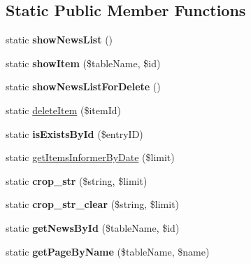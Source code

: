 \subsection*{Static Public Member Functions}
\begin{DoxyCompactItemize}
\item 
\hypertarget{class_news_main_aa5e3265e127fff127039ea005e893716}{}static {\bfseries show\+News\+List} ()\label{class_news_main_aa5e3265e127fff127039ea005e893716}

\item 
\hypertarget{class_news_main_a96d383bb24d7be6e66c160ae8e963bc1}{}static {\bfseries show\+Item} (\$table\+Name, \$id)\label{class_news_main_a96d383bb24d7be6e66c160ae8e963bc1}

\item 
\hypertarget{class_news_main_acdf65ae96d01cf941c387996b5d1e495}{}static {\bfseries show\+News\+List\+For\+Delete} ()\label{class_news_main_acdf65ae96d01cf941c387996b5d1e495}

\item 
static \hyperlink{class_news_main_af288d56be236ebdb2f34233da9fc5562}{delete\+Item} (\$item\+Id)
\item 
\hypertarget{class_news_main_af3c7e742a6317a8c2622e2375b966a3c}{}static {\bfseries is\+Exists\+By\+Id} (\$entry\+I\+D)\label{class_news_main_af3c7e742a6317a8c2622e2375b966a3c}

\item 
static \hyperlink{class_news_main_ab2ccf9b3eb9659b7c6f0ae9ba7ee4c1a}{get\+Items\+Informer\+By\+Date} (\$limit)
\item 
\hypertarget{class_news_main_acbb4c4222625933dec29541b73277ee9}{}static {\bfseries crop\+\_\+str} (\$string, \$limit)\label{class_news_main_acbb4c4222625933dec29541b73277ee9}

\item 
\hypertarget{class_news_main_a8ca74943296ddb1b1632fdad7ee132b9}{}static {\bfseries crop\+\_\+str\+\_\+clear} (\$string, \$limit)\label{class_news_main_a8ca74943296ddb1b1632fdad7ee132b9}

\item 
\hypertarget{class_news_main_a72a48dfbde41e541c5835be6f9712071}{}static {\bfseries get\+News\+By\+Id} (\$table\+Name, \$id)\label{class_news_main_a72a48dfbde41e541c5835be6f9712071}

\item 
\hypertarget{class_news_main_a4ad07e0b5f0ad51da6f2c6a58d5f5d15}{}static {\bfseries get\+Page\+By\+Name} (\$table\+Name, \$name)\label{class_news_main_a4ad07e0b5f0ad51da6f2c6a58d5f5d15}

\end{DoxyCompactItemize}
